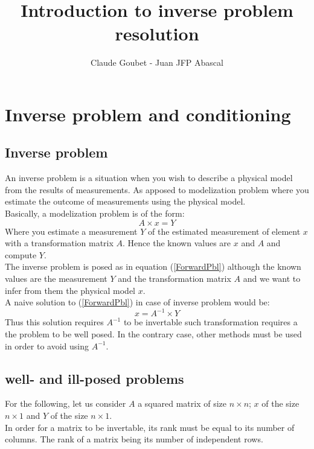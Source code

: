 \documentclass[10pt,a4paper]{report}
\author{Claude Goubet - Juan JFP Abascal}
\title{Introduction to inverse problem resolution}
\begin{document}
\maketitle
\chapter{Inverse problem and conditioning}

\section{Inverse problem}
An inverse problem is a situation when you wish to describe a physical model from the results of measurements. As apposed to modelization problem where you estimate the outcome of measurements using the physical model.\\
Basically, a modelization problem is of the form:
\begin{equation}
	A \times x = Y
\label{ForwardPbl}
\end{equation}
Where you estimate a measurement $Y$ of the estimated measurement of element $x$ with a transformation matrix $A$. Hence the known values are $x$ and $A$ and compute $Y$.\\
The inverse problem is posed as in equation (\ref{ForwardPbl}) although the known values are the measurement $Y$ and the transformation matrix $A$ and we want to infer from them the physical model $x$.\\
A naive solution to (\ref{ForwardPbl}) in case of inverse problem would be:
\begin{equation}
	x = A^{-1} \times Y
\end{equation}
Thus this solution requires $A^{-1}$ to be invertable such transformation requires a the problem to be well posed. In the contrary case, other methods must be used in order to avoid using $A^{-1}$.

\section{well- and ill-posed problems}

For the following, let us consider $A$ a squared matrix of size $n \times n$; $x$ of the size $n \times 1$ and $Y$ of the size $n \times 1$.\\

In order for a matrix to be invertable, its rank must be equal to its number of columns. The rank of a matrix being its number of independent rows. 
\end{document}
